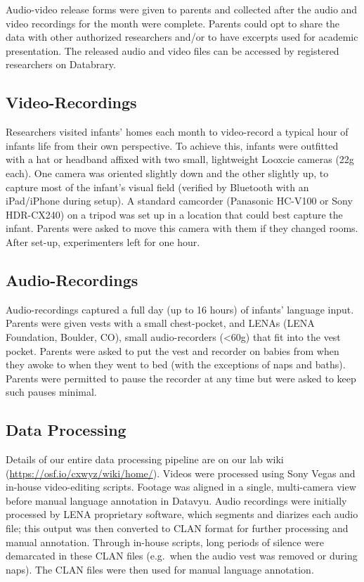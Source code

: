 \documentclass[man]{apa6}
\theoremstyle{definition}
\theoremstyle{definition}
\theoremstyle{definition}
\theoremstyle{remark}
\begin{document}
Audio-video release forms were given to parents and collected after the
audio and video recordings for the month were complete. Parents could
opt to share the data with other authorized researchers and/or to have
excerpts used for academic presentation. The released audio and video
files can be accessed by registered researchers on Databrary.

\subsection{Video-Recordings}\label{video-recordings}

Researchers visited infants' homes each month to video-record a typical
hour of infants life from their own perspective. To achieve this,
infants were outfitted with a hat or headband affixed with two small,
lightweight Looxcie cameras (22g each). One camera was oriented slightly
down and the other slightly up, to capture most of the infant's visual
field (verified by Bluetooth with an iPad/iPhone during setup). A
standard camcorder (Panasonic HC-V100 or Sony HDR-CX240) on a tripod was
set up in a location that could best capture the infant. Parents were
asked to move this camera with them if they changed rooms. After set-up,
experimenters left for one hour.

\subsection{Audio-Recordings}\label{audio-recordings}

Audio-recordings captured a full day (up to 16 hours) of infants'
language input. Parents were given vests with a small chest-pocket, and
LENAs (LENA Foundation, Boulder, CO), small audio-recorders
(\textless{}60g) that fit into the vest pocket. Parents were asked to
put the vest and recorder on babies from when they awoke to when they
went to bed (with the exceptions of naps and baths). Parents were
permitted to pause the recorder at any time but were asked to keep such
pauses minimal.

\subsection{Data Processing}\label{data-processing}

Details of our entire data processing pipeline are on our lab wiki
(\url{https://osf.io/cxwyz/wiki/home/}). Videos were processed using
Sony Vegas and in-house video-editing scripts. Footage was aligned in a
single, multi-camera view before manual language annotation in Datavyu.
Audio recordings were initially processed by LENA proprietary software,
which segments and diarizes each audio file; this output was then
converted to CLAN format for further processing and manual annotation.
Through in-house scripts, long periods of silence were demarcated in
these CLAN files (e.g.~when the audio vest was removed or during naps).
The CLAN files were then used for manual language annotation.
\end{document}
